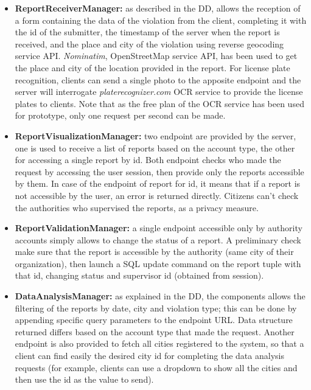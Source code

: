 \begin{itemize}
	\item \textbf{ReportReceiverManager:} as described in the DD, allows the reception of a form containing the data of the violation from the client, completing it with the id of the submitter, the timestamp of the server when the report is received, and the place and city of the violation using reverse geocoding service API. \textit{Nominatim}, OpenStreetMap service API, has been used to get the place and city of the location provided in the report. For license plate recognition, clients can send a single photo to the apposite endpoint and the server will interrogate \textit{platerecognizer.com} OCR service to provide the license plates to clients. Note that as the free plan of the OCR service has been used for prototype, only one request per second can be made.
	
	\item \textbf{ReportVisualizationManager:} two endpoint are provided by the server, one is used to receive a list of reports based on the account type, the other for accessing a single report by id. Both endpoint checks who made the request by accessing the user session, then provide only the reports accessible by them. In case of the endpoint of report for id, it means that if a report is not accessible by the user, an error is returned directly. Citizens can't check the authorities who supervised the reports, as a privacy measure.
	
	\item \textbf{ReportValidationManager:} a single endpoint accessible only by authority accounts simply allows to change the status of a report. A preliminary check make sure that the report is accessible by the authority (same city of their organization), then launch a SQL update command on the report tuple with that id, changing status and supervisor id (obtained from session).
	
	\item \textbf{DataAnalysisManager:} as explained in the DD, the components allows the filtering of the reports by date, city and violation type; this can be done by appending specific query parameters to the endpoint URL. Data structure returned differs based on the account type that made the request. Another endpoint is also provided to fetch all cities registered to the system, so that a client can find easily the desired city id for completing the data analysis requests (for example, clients can use a dropdown to show all the cities and then use the id as the value to send).
\end{itemize}